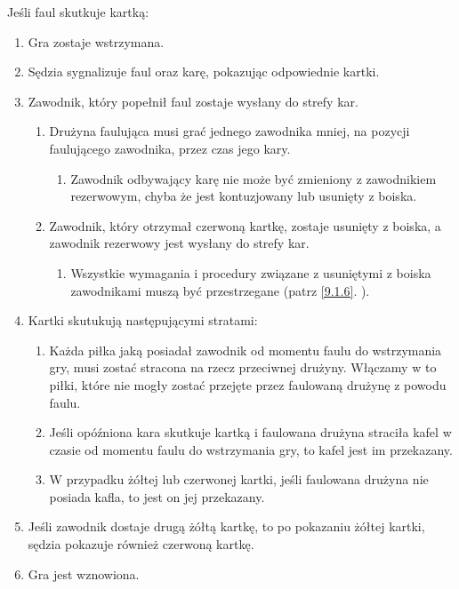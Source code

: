 \documentclass[11pt,a4paper]{article}
\renewcommand{\subsubsection}[1]{
  \oldsubsubsection{#1}%
  \label{\thesubsubsection}
}
\newcommand{\myref}[1]{\ref{#1}. \nameref{#1}}
\begin{document}
\subsubsection{Kartki}
Jeśli faul skutkuje kartką:
\begin{enumerate}
  \item Gra zostaje wstrzymana.
  \item Sędzia sygnalizuje faul oraz karę, pokazując odpowiednie kartki.
  \item Zawodnik, który popełnił faul zostaje wysłany do strefy kar.
  \begin{enumerate}
    \item Drużyna faulująca musi grać jednego zawodnika mniej, na pozycji faulującego zawodnika, przez czas jego kary.
    \begin{enumerate}
      \item Zawodnik odbywający karę nie może być zmieniony z zawodnikiem rezerwowym, chyba że jest kontuzjowany lub usunięty z boiska.
    \end{enumerate}
    \item Zawodnik, który otrzymał czerwoną kartkę, zostaje usunięty z boiska, a zawodnik rezerwowy jest wysłany do strefy kar.
    \begin{enumerate}
      \item Wszystkie wymagania i procedury związane z usuniętymi z boiska zawodnikami muszą być przestrzegane (patrz \myref{9.1.6}).
    \end{enumerate}
  \end{enumerate}
  \item Kartki skutukują następującymi stratami:
  \begin{enumerate}
    \item Każda piłka jaką posiadał zawodnik od momentu faulu do wstrzymania gry, musi zostać stracona na rzecz przeciwnej drużyny. Włączamy w to piłki, które nie mogły zostać przejęte przez faulowaną drużynę z powodu faulu.
    \item Jeśli opóźniona kara skutkuje kartką i faulowana drużyna straciła kafel w czasie od momentu faulu do wstrzymania gry, to kafel jest im przekazany.
    \item W przypadku żółtej lub czerwonej kartki, jeśli faulowana drużyna nie posiada kafla, to jest on jej przekazany.
  \end{enumerate}
  \item Jeśli zawodnik dostaje drugą żółtą kartkę, to po pokazaniu żółtej kartki, sędzia pokazuje również czerwoną kartkę.
  \item Gra jest wznowiona.
\end{enumerate}
\end{document}
